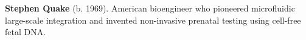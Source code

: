 \textbf{Stephen Quake} (b. 1969). American bioengineer who pioneered microfluidic large-scale integration and invented non-invasive prenatal testing using cell-free fetal DNA.

